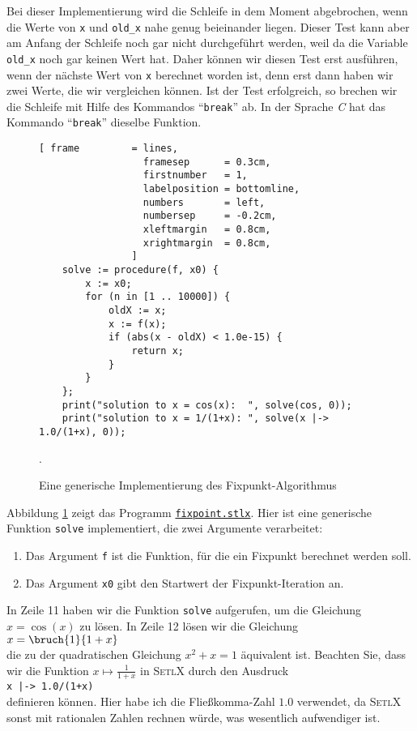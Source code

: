 Bei dieser Implementierung wird die Schleife in dem Moment abgebrochen, wenn die
Werte von \texttt{x} und \texttt{old\_x} nahe genug beieinander liegen.  Dieser
Test kann aber am Anfang der Schleife noch gar nicht durchgeführt werden, weil
da die Variable \texttt{old\_x} noch gar keinen Wert hat.  Daher können wir diesen Test 
erst ausführen, wenn der nächste Wert von \texttt{x} berechnet worden ist, denn erst dann 
haben wir zwei Werte, die wir vergleichen können.  Ist der Test erfolgreich, so brechen wir die
Schleife mit Hilfe des  Kommandos ``\texttt{break}'' ab.  
In der Sprache \textsl{C} hat das Kommando ``\texttt{break}'' dieselbe Funktion.  


\begin{figure}[!ht]
\centering
\begin{Verbatim}[ frame         = lines, 
                  framesep      = 0.3cm, 
                  firstnumber   = 1,
                  labelposition = bottomline,
                  numbers       = left,
                  numbersep     = -0.2cm,
                  xleftmargin   = 0.8cm,
                  xrightmargin  = 0.8cm,
                ]
    solve := procedure(f, x0) {
        x := x0;
        for (n in [1 .. 10000]) {
            oldX := x;
            x := f(x);
            if (abs(x - oldX) < 1.0e-15) {
                return x;
            }
        }
    };
    print("solution to x = cos(x):  ", solve(cos, 0));
    print("solution to x = 1/(1+x): ", solve(x |-> 1.0/(1+x), 0));
\end{Verbatim}
\vspace*{-0.3cm}
\caption{Eine generische Implementierung des Fixpunkt-Algorithmus}.
\label{fig:fixpoint.stlx}
\end{figure}

Abbildung \ref{fig:fixpoint.stlx} zeigt das Programm
\href{https://github.com/karlstroetmann/Logik/blob/master/SetlX/fixpoint.stlx}{\texttt{fixpoint.stlx}}.
Hier ist eine generische Funktion \texttt{solve} implementiert, die zwei Argumente verarbeitet: 
\pagebreak

\begin{enumerate}
\item Das Argument \texttt{f} ist die Funktion, für die ein Fixpunkt berechnet werden soll.
\item Das Argument \texttt{x0} gibt den Startwert der Fixpunkt-Iteration an.
\end{enumerate}
In Zeile 11 haben wir die Funktion \texttt{solve} aufgerufen, um die Gleichung $x = \cos(x)$ zu
lösen.  In Zeile 12 lösen wir die Gleichung 
\\[0.2cm]
\hspace*{1.3cm}
$x = \bruch{1}{1+x}$ 
\\[0.2cm]
die zu der quadratischen Gleichung $x^2 + x = 1$ äquivalent ist.  Beachten Sie, dass wir die
Funktion $x \mapsto \frac{1}{1+x}$ in \textsc{SetlX} durch den Ausdruck
\\[0.2cm]
\hspace*{1.3cm}
\texttt{x |-> 1.0/(1+x)}
\\[0.2cm]
definieren können.  Hier habe ich die Fließkomma-Zahl $1.0$ verwendet, da \textsc{SetlX} sonst mit
rationalen Zahlen rechnen würde, was wesentlich aufwendiger ist.



